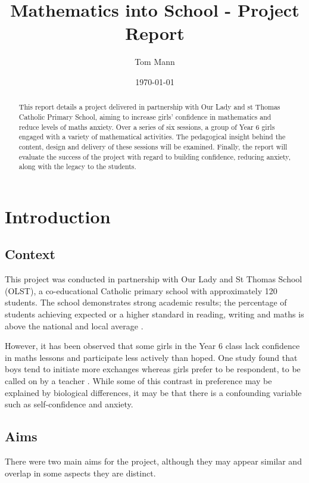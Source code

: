 \documentclass[11pt, a4paper, notitlepage]{article}
\title{Mathematics into School - Project Report}
\author{Tom Mann}
\date{\today}
\begin{document}
\maketitle

\begin{abstract}
    This report details a project delivered in partnership with Our Lady and st Thomas Catholic Primary School, aiming to increase girls' confidence in mathematics and reduce levels of maths anxiety. Over a series of six sessions, a group of Year 6 girls engaged with a variety of mathematical activities. The pedagogical insight behind the content, design and delivery of these sessions will be examined. Finally, the report will evaluate the success of the project with regard to building confidence, reducing anxiety, along with the legacy to the students.
\end{abstract}


\tableofcontents

\clearpage

\section{Introduction}

\subsection{Context}
This project was conducted in partnership with Our Lady and St Thomas School (OLST), a  co-educational Catholic primary school with approximately 120 students. The school demonstrates strong academic results; the percentage of students achieving expected or a higher standard in reading, writing and maths is above the national and local average \cite{OLST_stats}.
\par
However, it has been observed that some girls in the Year 6 class lack confidence in maths lessons and participate less actively than hoped. One study found that boys tend to initiate more exchanges whereas girls prefer to be respondent, to be called on by a teacher \cite{Rashid:2012}. While some of this contrast in preference may be explained by biological differences, it may be that there is a confounding variable such as self-confidence and anxiety. 


\subsection{Aims}
There were two main aims for the project, although they may appear similar and overlap in some aspects they are distinct.
\end{document}
